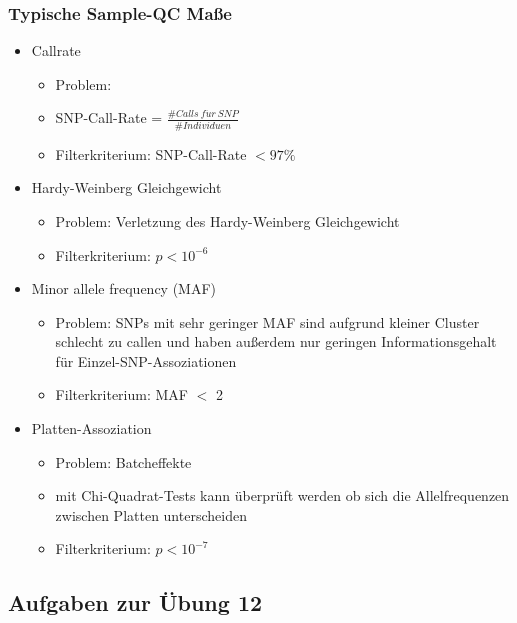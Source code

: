 \subsubsection{Typische Sample-QC Maße}
\begin{itemize}
	\item Callrate
	\begin{itemize}
		\item Problem: 
		\item SNP-Call-Rate = $\frac{\#Calls\ f\ddot{u}r\ SNP}{\#Individuen}$
		\item Filterkriterium: SNP-Call-Rate $<97\%$
	\end{itemize}
	\item Hardy-Weinberg Gleichgewicht
	\begin{itemize}
		\item Problem: Verletzung des Hardy-Weinberg Gleichgewicht
		\item Filterkriterium: $p<10^{-6}$
	\end{itemize}
	\item Minor allele frequency (MAF)
	\begin{itemize}
		\item Problem: SNPs mit sehr geringer MAF sind aufgrund kleiner Cluster schlecht zu callen und haben außerdem nur geringen Informationsgehalt für Einzel-SNP-Assoziationen
		\item Filterkriterium: MAF $<$ 2
	\end{itemize}
	\item Platten-Assoziation
	\begin{itemize}
		\item Problem: Batcheffekte
		\item mit Chi-Quadrat-Tests kann überprüft werden ob sich die Allelfrequenzen zwischen Platten unterscheiden
		\item Filterkriterium: $p<10^{-7}$
	\end{itemize}
\end{itemize}

\subsection{Aufgaben zur Übung 12}